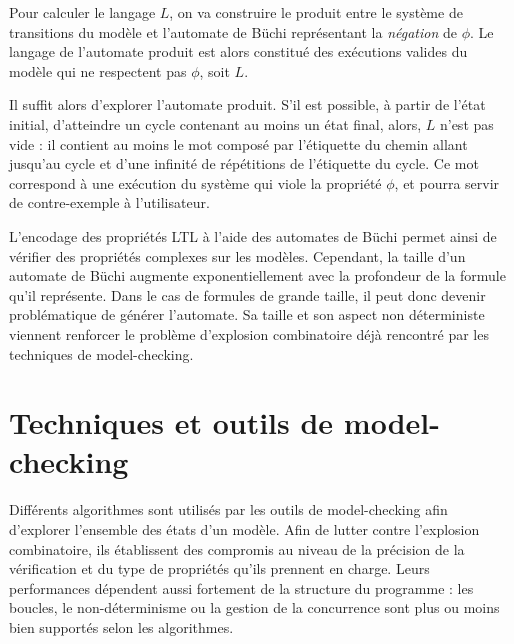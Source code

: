 Pour calculer le langage \(L\), on va construire le produit entre le système de
transitions du modèle et l'automate de Büchi représentant la \emph{négation} de
\(\phi\). Le langage de l'automate produit est alors constitué des exécutions valides du
modèle qui ne respectent pas \(\phi\), soit \(L\).

Il suffit alors d'explorer l'automate produit. S’il est possible, à partir
de l'état initial, d'atteindre un cycle contenant au moins un état final, alors,
\(L\) n'est pas vide : il contient au moins le mot composé par l'étiquette du
chemin allant jusqu'au cycle et d'une infinité de répétitions de l'étiquette du
cycle. Ce mot correspond à une exécution du système qui viole la propriété \(\phi\),
et pourra servir de contre-exemple à l'utilisateur.

L'encodage des propriétés \ac{LTL} à l'aide des automates de Büchi permet ainsi de
vérifier des propriétés complexes sur les modèles. Cependant, la taille d'un
automate de Büchi augmente exponentiellement avec la profondeur de la formule
qu'il représente. Dans le cas de formules de grande taille, il peut donc devenir
problématique de générer l'automate. Sa taille et son aspect non déterministe
viennent renforcer le problème d'explosion combinatoire déjà rencontré par les
techniques de model-checking.

\section{Techniques et outils de model-checking}
\label{sec:techniques-et-outils-de-model-checking}

Différents algorithmes sont utilisés par les outils de model-checking
afin d'explorer l'ensemble des états d'un modèle. Afin de lutter contre
l'explosion combinatoire, ils établissent des compromis au niveau de la
précision de la vérification et du type de propriétés qu'ils prennent en charge.
Leurs performances dépendent aussi fortement de la
structure du programme : les boucles, le non-déterminisme ou la gestion
de la concurrence sont plus ou moins bien supportés selon
les algorithmes.

